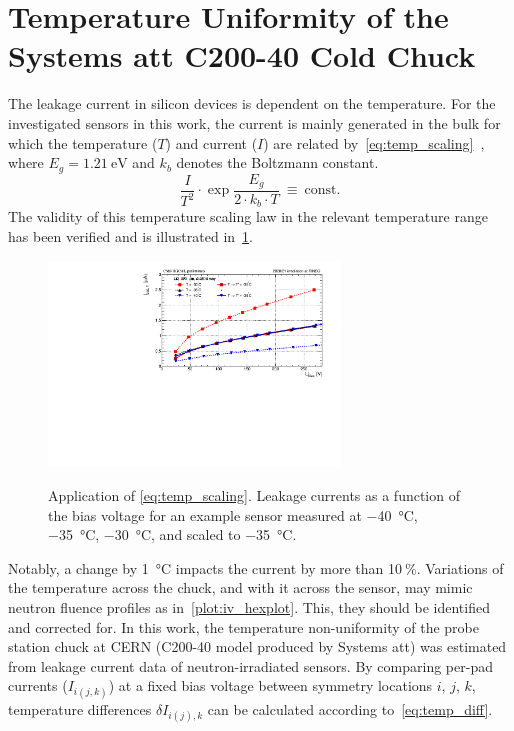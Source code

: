 \section{Temperature Uniformity of the Systems att C200-40 Cold Chuck}
\label{appendix:chuck_temp}
The leakage current in silicon devices is dependent on the temperature.
For the investigated sensors in this work, the current is mainly generated in the bulk for which the temperature ($T$) and current ($I$) are related by~\ref{eq:temp_scaling}~\cite{Chilingarov_2013}, where $E_g=\SI{1.21}{\electronvolt}$ and $k_b$ denotes the Boltzmann constant.
\begin{equation}
    \frac{I}{T^2}\cdot \exp{\frac{E_g}{2\cdot k_b \cdot T}}~\equiv~\text{const.}
    \label{eq:temp_scaling}
\end{equation}
The validity of this temperature scaling law in the relevant temperature range has been verified and is illustrated in~\ref{plot:iv_tempscaling}.
\begin{figure}[h]
	\centering
	\includegraphics[width=0.69\textwidth]{plots/iv_temp_scaling/iv_overlay_ch24.pdf}
	\label{plot:iv_tempscaling}
	\caption{
		Application of \ref{eq:temp_scaling}. 
		Leakage currents as a function of the bias voltage for an example sensor measured at \SI{-40}{\celsius}, \SI{-35}{\celsius}, \SI{-30}{\celsius}, and scaled to \SI{-35}{\celsius}.
		}
	\end{figure}
Notably, a change by \SI{1}{\celsius} impacts the current by more than 10$~\%$. 
Variations of the temperature across the chuck, and with it across the sensor, may mimic neutron fluence profiles as in~\ref{plot:iv_hexplot}. 
This, they should be identified and corrected for.\newline
In this work, the temperature non-uniformity of the probe station chuck at CERN (C200-40 model produced by Systems att) was estimated from leakage current data of neutron-irradiated sensors.
By comparing per-pad currents ($I_{i(j,k)}$) at a fixed bias voltage between symmetry locations $i$, $j$, $k$, temperature differences $\delta I_{i(j), k}$ can be calculated according to~\ref{eq:temp_diff}.
